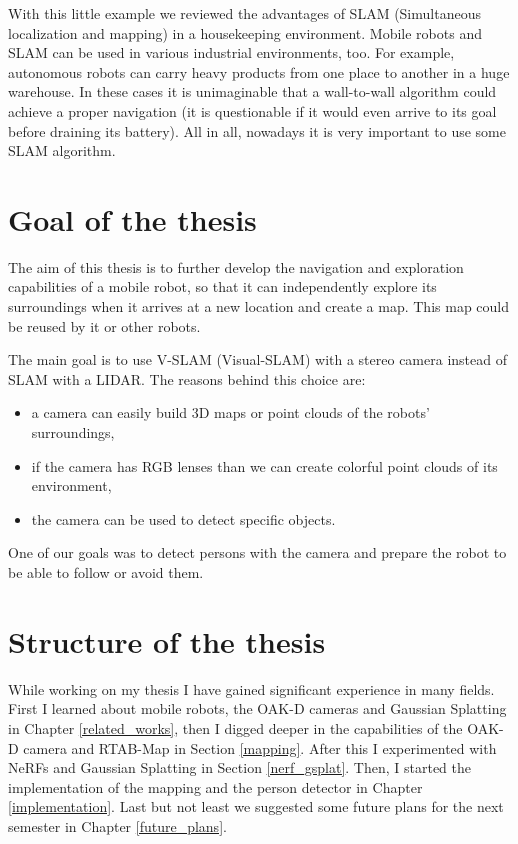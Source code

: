 With this little example we reviewed the advantages of SLAM (Simultaneous localization and mapping) in a housekeeping environment. Mobile robots and SLAM can be used in various industrial environments, too. For example, autonomous robots can carry heavy products from one place to another in a huge warehouse. In these cases it is unimaginable that a wall-to-wall algorithm could achieve a proper navigation (it is questionable if it would even arrive to its goal before draining its battery). All in all, nowadays it is very important to use some SLAM algorithm.

\section{Goal of the thesis}

The aim of this thesis is to further develop the navigation and exploration capabilities of a mobile robot, so that it can independently explore its surroundings when it arrives at a new location and create a map. This map could be reused by it or other robots.

The main goal is to use V-SLAM (Visual-SLAM) with a stereo camera instead of SLAM with a LIDAR. The reasons behind this choice are:
\begin{itemize}
    \item a camera can easily build 3D maps or point clouds of the robots' surroundings,
    \item if the camera has RGB lenses than we can create colorful point clouds of its environment,
    \item the camera can be used to detect specific objects.
\end{itemize}
One of our goals was to detect persons with the camera and prepare the robot to be able to follow or avoid them.

\section{Structure of the thesis}

While working on my thesis I have gained significant experience in many fields. First I learned about mobile robots, the OAK-D cameras and Gaussian Splatting in Chapter \ref{related_works}, then I digged deeper in the capabilities of the OAK-D camera and RTAB-Map in Section \ref{mapping}. After this I experimented with NeRFs and Gaussian Splatting in Section \ref{nerf_gsplat}. Then, I started the implementation of the mapping and the person detector in Chapter \ref{implementation}. Last but not least we suggested some future plans for the next semester in Chapter \ref{future_plans}.
